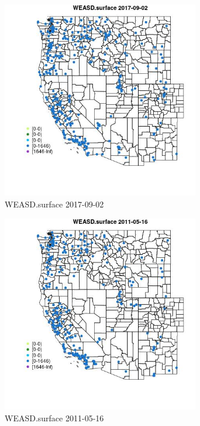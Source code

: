 \begin{figure} 
\centering  
\includegraphics[width=0.77\textwidth]{Code_Outputs/Report_ML_input_PM25_Step4_part_e_de_duplicated_aves_compiled_2019-05-20wNAs_MapObsWEASDsurface2017-09-02.jpg} 
\caption{\label{fig:Report_ML_input_PM25_Step4_part_e_de_duplicated_aves_compiled_2019-05-20wNAsMapObsWEASDsurface2017-09-02}WEASD.surface 2017-09-02} 
\end{figure} 
 

\begin{figure} 
\centering  
\includegraphics[width=0.77\textwidth]{Code_Outputs/Report_ML_input_PM25_Step4_part_e_de_duplicated_aves_compiled_2019-05-20wNAs_MapObsWEASDsurface2011-05-16.jpg} 
\caption{\label{fig:Report_ML_input_PM25_Step4_part_e_de_duplicated_aves_compiled_2019-05-20wNAsMapObsWEASDsurface2011-05-16}WEASD.surface 2011-05-16} 
\end{figure} 
 


